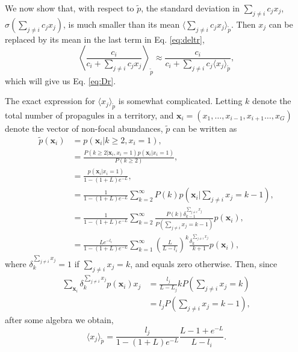 \documentclass[11pt]{article}
\begin{document}
We now show that, with respect to $\tilde{p}$, the standard deviation in $\sum_{j\neq i} c_j x_j$, $\sigma(\sum_{j\neq i} c_j x_j)$, is much smaller than its mean $\langle\sum_{j\neq i} c_j x_j\rangle_{\tilde{p}}$. Then $x_j$ can be replaced by its mean in the last term in Eq. \eqref{eq:deltr},
\begin{equation}
\left\langle\frac{c_i}{c_i +\sum_{j\neq i} c_j x_j}\right\rangle_{\tilde{p}}\approx \frac{c_i}{c_i +\sum_{j\neq i} c_j \langle x_j\rangle_{\tilde{p}}},\label{eq:meanfieldr}
\end{equation}
which will give us Eq. \eqref{eq:Dr}.

The exact expression for $\langle x_j \rangle_{\tilde{p}}$ is somewhat complicated. Letting $k$ denote the total number of propagules in a territory, and ${\mathbf x_i}=(x_1,\ldots,x_{i-1},x_{i+1}\ldots,x_G)$ denote the vector of non-focal abundances, $\tilde{p}$ can be written as
\begin{align}
\tilde{p}({\mathbf x_i})&=p({\mathbf x_i}|k\geq 2,x_i=1),\nonumber\\
&=\frac{P(k\geq 2|{\mathbf x_i},x_i=1) p({\mathbf x_i}|x_i=1)}{P(k\geq 2)},\nonumber\\
&=\frac{p({\mathbf x_i}|x_i=1)}{1-(1+L)e^{-L}},\nonumber\\
&=\frac{1}{1-(1+L)e^{-L}}\sum_{k=2}^{\infty} P(k) p({\mathbf x_i}|\sum_{j\neq i} x_j=k-1),\nonumber\\
&=\frac{1}{1-(1+L)e^{-L}}\sum_{k=2}^{\infty} \frac{P(k)\delta^{\sum_{j\neq i} x_j}_{k-1}}{P(\sum_{j\neq i} x_j=k-1)} p({\mathbf x_i}),\nonumber\\
&=\frac{Le^{-l_i}}{1-(1+L)e^{-L}}\sum_{k=1}^{\infty} \left(\frac{L}{L-l_i}\right)^k\frac{\delta^{\sum_{j\neq i} x_j}_k}{k+1} p({\mathbf x_i}),\label{eq:raremonster}
\end{align}
where $\delta^{\sum_{j\neq i} x_j}_k=1$ if $\sum_{j\neq i} x_j=k$, and equals zero otherwise. Then, since 
\begin{align}
\sum_{\mathbf x_i}\delta^{\sum_{j\neq i} x_j}_k p({\mathbf x_i})x_j&= \frac{l_j}{L-L_j}kP(\sum_{j\neq i} x_j=k)\nonumber\\
&=l_j P(\sum_{j\neq i} x_j=k-1),
\end{align}
after some algebra we obtain,
\begin{equation}
\langle x_j \rangle_{\tilde{p}}=\frac{l_j}{1-(1+L)e^{-L}}\frac{L-1+e^{-L}}{L-l_i}.\label{eq:meanxjrare}
\end{equation}
\end{document}
